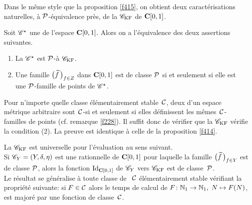 \medskip \noindent Dans le même style que la proposition \ref{f415}, on obtient deux 
caractérisations naturelles, à ${\cal P}$-équivalence près, de la \rp   ${{{\mathscr C}}_{\rm KF}}$  
de  ${{\bf C}[0,1]}$.  

\begin{fproposition} \label{f416}
Soit ${{\mathscr C}}^{\star}$  une \rp  de l'espace  ${{\bf C}[0,1]}$.  
Alors on a l'équivalence des deux assertions suivantes.   
%
\begin{enumerate}
%
\item La \pres  ${{\mathscr C}}^{\star}$ est ${\cal P}$-\equiva à  ${{{\mathscr C}}_{\rm KF}}$.
%
\item Une famille  $\big(\widetilde{f}\,\big)_{f \in Z}$  dans  ${{\bf C}[0,1]}$  est \uni de classe  
${\cal P}$  si et seulement si elle est une ${\cal P}$-famille de points de  ${{\mathscr C}}^{\star}$.
%
\end{enumerate}
\end{fproposition}

\proof 
Pour n'importe quelle classe élémentairement stable~${{\cal C}}$, deux \rps  d'un espace métrique arbitraire sont~${{\cal C}}$-\equivas si et seulement si elles définissent les mêmes~${{\cal C}}$-familles de points (cf. remarque \ref{f228}). Il suffit donc de vérifier que la \rp   ${{{\mathscr C}}_{\rm KF}}$  vérifie la condition (2). La preuve est identique à celle de la proposition \ref{f414}. 
\eop


\begin{ftheorem} \label{f417}
La \pres  ${{{\mathscr C}}_{\rm KF}}$  est universelle pour l'évaluation au sens suivant.\\
 Si  ${{\mathscr C}}_Y=(Y,\delta,\eta)$  est une \pres rationnelle de  ${{\bf C}[0,1]}$  pour laquelle la famille  
$\big(\widetilde{f}\,\big)_{f \in Y}$  est \uni de classe ${\cal P}$,  
alors la fonction  ${\rm Id}_{{\bf C}[0,1]}$  de ${{\mathscr C}}_Y$  vers  ${{{\mathscr C}}_{\rm KF}}$  est \uni de 
classe~${\cal P}$.\\ 
Le résultat se généralise à toute classe de \com~${{\cal C}}$   
élémentairement stable vérifiant la propriété suivante:
si  $F \in {{\cal C}}$  alors le temps de calcul de $F\colon  \mathbb {N}_1 \rightarrow \mathbb {N}_1,\; N 
\mapsto F(N)$,  est majoré par une fonction de classe~${{\cal C}}$.
\end{ftheorem}

